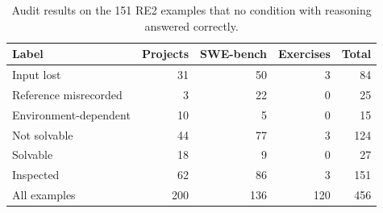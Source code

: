 \begin{table}[t]
\centering
\small
\caption{Audit results on the 151 RE2 examples that no condition with reasoning answered correctly.}
\label{tab:audit}
\begin{tabular}{@{}lrrrr@{}}
\toprule
Label & Projects & SWE-bench & Exercises & Total \\
\midrule
Input lost & 31 & 50 & 3 & 84 \\
Reference misrecorded & 3 & 22 & 0 & 25 \\
Environment-dependent & 10 & 5 & 0 & 15 \\
\midrule
Not solvable & 44 & 77 & 3 & 124 \\
Solvable & 18 & 9 & 0 & 27 \\
\midrule
Inspected & 62 & 86 & 3 & 151 \\
All examples & 200 & 136 & 120 & 456 \\
\bottomrule
\end{tabular}
\end{table}

